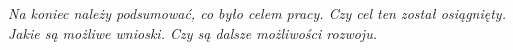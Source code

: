 \textit{Na koniec należy podsumować, co było celem pracy. Czy cel ten został osiągnięty. Jakie są możliwe wnioski. Czy są dalsze możliwości rozwoju.}
